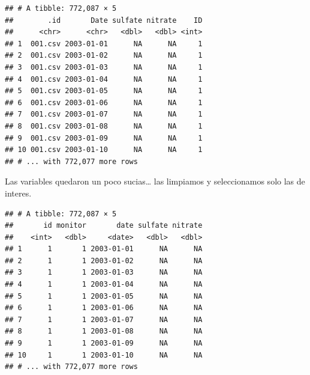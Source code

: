 \documentclass[]{article}
\newenvironment{Shaded}{\begin{snugshade}}{\end{snugshade}}
\newcommand{\KeywordTok}[1]{\textcolor[rgb]{0.13,0.29,0.53}{\textbf{{#1}}}}
\newcommand{\DataTypeTok}[1]{\textcolor[rgb]{0.13,0.29,0.53}{{#1}}}
\newcommand{\StringTok}[1]{\textcolor[rgb]{0.31,0.60,0.02}{{#1}}}
\newcommand{\NormalTok}[1]{{#1}}
\begin{document}
\begin{verbatim}
## # A tibble: 772,087 × 5
##        .id       Date sulfate nitrate    ID
##      <chr>      <chr>   <dbl>   <dbl> <int>
## 1  001.csv 2003-01-01      NA      NA     1
## 2  001.csv 2003-01-02      NA      NA     1
## 3  001.csv 2003-01-03      NA      NA     1
## 4  001.csv 2003-01-04      NA      NA     1
## 5  001.csv 2003-01-05      NA      NA     1
## 6  001.csv 2003-01-06      NA      NA     1
## 7  001.csv 2003-01-07      NA      NA     1
## 8  001.csv 2003-01-08      NA      NA     1
## 9  001.csv 2003-01-09      NA      NA     1
## 10 001.csv 2003-01-10      NA      NA     1
## # ... with 772,077 more rows
\end{verbatim}

Las variables quedaron un poco sucias\ldots{} las limpiamos y
seleccionamos solo las de interes.

\begin{Shaded}
\end{Shaded}

\begin{verbatim}
## # A tibble: 772,087 × 5
##       id monitor       date sulfate nitrate
##    <int>   <dbl>     <date>   <dbl>   <dbl>
## 1      1       1 2003-01-01      NA      NA
## 2      1       1 2003-01-02      NA      NA
## 3      1       1 2003-01-03      NA      NA
## 4      1       1 2003-01-04      NA      NA
## 5      1       1 2003-01-05      NA      NA
## 6      1       1 2003-01-06      NA      NA
## 7      1       1 2003-01-07      NA      NA
## 8      1       1 2003-01-08      NA      NA
## 9      1       1 2003-01-09      NA      NA
## 10     1       1 2003-01-10      NA      NA
## # ... with 772,077 more rows
\end{verbatim}
\end{document}
